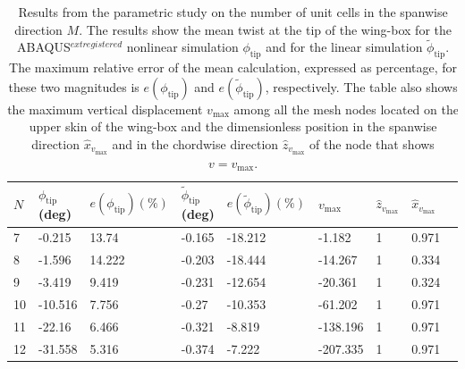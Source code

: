     \begin{table}[!htpb] %
      \centering
      \begin{tabular}{|l|l|l|l|l|l|l|l|l|}
      \hline
      $N$ & $\phi_{\mathrm{tip}}$ (deg) & $e(\phi_{\mathrm{tip}}) (\%)$ & $\tilde{\phi}_{\mathrm{tip}}$ (deg) & $e(\tilde{\phi}_{\mathrm{tip}}) (\%)$ & $v_{\mathrm{max}}$ & $\hat{z}_{v_{\mathrm{max}}}$ & $\hat{x}_{v_{\mathrm{max}}}$ \\ \hline
      7 & -0.215 & 13.74 & -0.165 & -18.212 & -1.182 & 1 & 0.971 \\ \hline
      8 & -1.596 & 14.222 & -0.203 & -18.444 & -14.267 & 1 & 0.334 \\ \hline
      9 & -3.419 & 9.419 & -0.231 & -12.654 & -20.361 & 1 & 0.324 \\ \hline
      10 & -10.516 & 7.756 & -0.27 & -10.353 & -61.202 & 1 & 0.971 \\ \hline
      11 & -22.16 & 6.466 & -0.321 & -8.819 & -138.196 & 1 & 0.971 \\ \hline
      12 & -31.558 & 5.316 & -0.374 & -7.222 & -207.335 & 1 & 0.971 \\ \hline
      \end{tabular}
      \caption[Results from the parametric study on the number of unit cells in the spanwise direction]{Results from the parametric study on the number of unit cells in the spanwise direction $M$. The results show the mean twist at the tip of the wing-box for the ABAQUS$^{	extregistered}$ nonlinear simulation $\phi_{\mathrm{tip}}$ and for the linear simulation $\tilde{\phi}_{\mathrm{tip}}$. The maximum relative error of the mean calculation, expressed as percentage, for these two magnitudes is $e(\phi_{\mathrm{tip}})$ and $e(\tilde{\phi}_{\mathrm{tip}})$, respectively. The table also shows the maximum vertical displacement $v_{\mathrm{max}}$ among all the mesh nodes located on the upper skin of the wing-box and the dimensionless position in the spanwise direction $\hat{x}_{v_{\mathrm{max}}}$ and in the chordwise direction $\hat{z}_{v_{\mathrm{max}}}$ of the node that shows $v = v_{\mathrm{max}}$.}
      \label{tab:para_N}
    \end{table}

